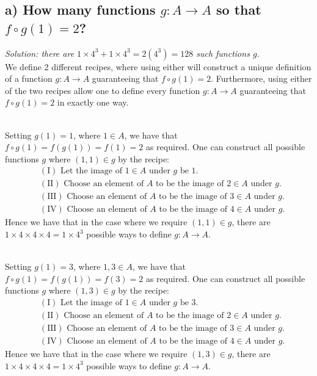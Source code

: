\documentclass[11pt, letterpaper]{article}
\begin{document}
\subsection*{a) How many functions $g:A\rightarrow A$ so that $f\circ g(1)=2$?}
{\large\it Solution: there are $1\times 4^3+1\times 4^3=2(4^3)=128$ such functions $g$.}\\[0.25cm]
We define 2 different recipes, where using either will construct a unique definition of a function $g:A\rightarrow A$ guaranteeing that $f\circ g(1)=2$.
Furthermore, using either of the two recipes allow one to define every function $g:A\rightarrow A$ guaranteeing that $f\circ g(1)=2$ in exactly one way. 
\begin{recipe}~\\
        Setting $g(1)=1$, where $1\in A$, we have that $f\circ g(1)=f(g(1))=f(1)=2$ as required. One can construct all possible functions $g$ where $(1,1)\in g$ by the recipe:
    \begin{align*}
        &(\text{I}) \text{ Let the image of $1\in A$ under $g$ be 1.}\\
        &(\text{II}) \text{ Choose an element of $A$ to be the image of $2\in A$ under $g$.}\\
        &(\text{III}) \text{ Choose an element of $A$ to be the image of $3\in A$ under $g$.}\\
        &(\text{IV}) \text{ Choose an element of $A$ to be the image of $4\in A$ under $g$.}
    \end{align*}
    Hence we have that in the case where we require $(1,1)\in g$, there are $1\times 4\times 4\times 4=1\times 4^3$ possible ways to define $g:A\rightarrow A$.
\end{recipe}
\begin{recipe}~\\
    Setting $g(1)=3$, where $1,3\in A$, we have that $f\circ g(1)=f(g(1))=f(3)=2$ as required. One can construct all possible functions $g$ where $(1,3)\in g$ by the recipe:
    \begin{align*}
        &(\text{I}) \text{ Let the image of $1\in A$ under $g$ be 3.}\\
        &(\text{II}) \text{ Choose an element of $A$ to be the image of $2\in A$ under $g$.}\\
        &(\text{III}) \text{ Choose an element of $A$ to be the image of $3\in A$ under $g$.}\\
        &(\text{IV}) \text{ Choose an element of $A$ to be the image of $4\in A$ under $g$.}
    \end{align*}
    Hence we have that in the case where we require $(1,3)\in g$, there are $1\times 4\times 4\times 4=1\times 4^3$ possible ways to define $g:A\rightarrow A$.
\end{recipe}
\end{document}
